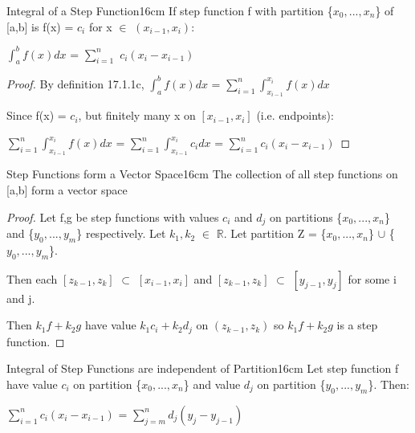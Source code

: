    \vspace{0.5cm}



    \begin{wtheorem}{Integral of a Step Function}{16cm}
        If step function f with partition \{$x_0,...,x_n$\} of [a,b]
        is f(x) = $c_i$ for x $\in$ $(x_{i-1},x_i)$:

        \hspace{0.5cm}
        $\int_a^b f(x) dx$
        = $\sum_{i=1}^n$ $c_i(x_i - x_{i-1})$
    \end{wtheorem}

    \begin{proof}
        By {\color{blue} definition 17.1.1c},
        $\int_a^b f(x) dx$
        = $\sum_{i=1}^n \int_{x_{i-1}}^{x_i} f(x) dx$

        Since f(x) = $c_i$, but finitely many x on $[x_{i-1},x_i]$ (i.e. endpoints):

        \hspace{0.5cm}
        $\sum_{i=1}^n \int_{x_{i-1}}^{x_i} f(x) dx$
        = $\sum_{i=1}^n \int_{x_{i-1}}^{x_i} c_i dx$
        = $\sum_{i=1}^n c_i(x_i - x_{i-1})$
    \end{proof}

    \newpage



    \begin{wtheorem}{Step Functions form a Vector Space}{16cm}
        The collection of all step functions on [a,b] form a vector space
    \end{wtheorem}

    \begin{proof}
        Let f,g be step functions with values $c_i$ and $d_j$ on partitions
        \{$x_0,...,x_n$\} and \{$y_0,...,y_m$\} respectively.
        Let $k_1,k_2$ $\in$ $\mathbb{R}$.
        Let partition Z = \{$x_0,...,x_n$\} $\cup$ \{$y_0,...,y_m$\}.

        Then each $[z_{k-1},z_k]$ $\subset$ $[x_{i-1},x_i]$
        and $[z_{k-1},z_k]$ $\subset$ $[y_{j-1},y_j]$ for some i and j.

        Then $k_1f + k_2g$
        have value $k_1c_i + k_2d_j$ on $(z_{k-1},z_k)$
        so $k_1f + k_2g$ is a step function.
    \end{proof}

    \vspace{0.5cm}



    \begin{wtheorem}{Integral of Step Functions are independent of Partition}{16cm}
        Let step function f have value $c_i$ on partition \{$x_0,...,x_n$\}
        and value $d_j$ on partition \{$y_0,...,y_m$\}. Then:

        \hspace{0.5cm}
        $\sum_{i=1}^n c_i(x_i - x_{i-1})$
        = $\sum_{j=m}^n d_j(y_j - y_{j-1})$
    \end{wtheorem}

